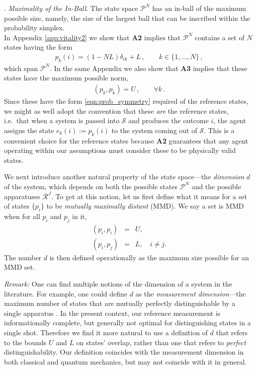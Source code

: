 \documentclass[%
 reprint,superscriptaddress,
 amsmath,amssymb,
 aps,pra, onecolumn, 12pt
]{revtex4-2}
\newcommand{\eqn}[1]{\begin{eqnarray} #1 \end{eqnarray}}
\newcommand{\tit}[1]{\textit{#1}}
\begin{document}
. \tit{Maximality of the In-Ball}. The state space $\mathcal{P}^N$ has an in-ball of the maximum possible size, namely, the size of the largest ball that can be inscribed within the probability simplex.\\

In Appendix \ref{app:vitality2} we show that {\bf A2} implies that $\mathcal{P}^N$ contains a set of $N$ states having the form
\eqn{ \label{eqn:basis_states}
p_k(i) = (1-NL)\delta_{ik} + L \, , \qquad k \in \{1,\dots, N\} \, ,
}
which span $\mathcal{P}^N$. In the same Appendix we also show that {\bf A3} implies that these states have the maximum possible norm,
\eqn{ \label{eqn:extremality}
(p_k,p_k) = U \, , \qquad \forall k \, .
}
Since these have the form \eqref{eqn:prob_symmetry} required of the reference states, we might as well adopt the convention that these \tit{are} the reference states, i.e.\ that when a system is passed into $\mathcal{S}$ and produces the outcome $i$, the agent assigns the state $e_k(i) := p_k(i)$ to the system coming out of $\mathcal{S}$. This is a convenient choice for the reference states because {\bf A2} guarantees that any agent operating within our assumptions must consider these to be physically valid states.

We next introduce another natural property of the state space---the \tit{dimension} $d$ of the system, which depends on both the possible states $\mathcal{P}^N$ and the possible apparatuses $\mathcal{R}^J$. To get at this notion, let us first define what it means for a set of states $\{p_i\}$ to be \tit{mutually maximally distant} (MMD).  We say a set is MMD when for all $p_i$ and $p_j$ in it,
\eqn{
(p_i, p_i) &=& U, \nonumber \\
(p_i, p_j) &=& L,  \quad  i \neq j.
}
The number $d$ is then defined operationally as the maximum size possible for an MMD set.

\tit{Remark:} One can find multiple notions of the dimension of a system in the literature. For example, one could define $d$ as the \tit{measurement dimension}---the maximum number of states that are mutually perfectly distinguishable by a single apparatus \cite{BRU14}. In the present context, our reference measurement is informationally complete, but generally not optimal for distinguishing states in a single shot. Therefore we find it more natural to use a definition of $d$ that refers to the bounds $U$ and $L$ on states' overlap, rather than one that refers to \tit{perfect} distinguishability. Our definition coincides with the measurement dimension in both classical and quantum mechanics, but may not coincide with it in general.
\end{document}
